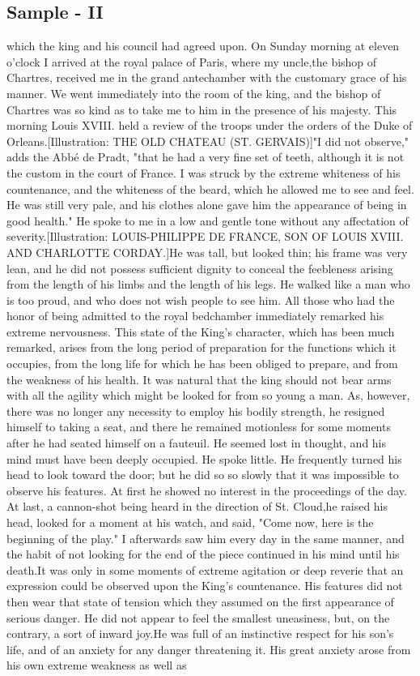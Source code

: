 \documentclass[a4paper]{article}
\begin{document}
\subsection{Sample - II}
which the king and his council had agreed upon. On Sunday morning at eleven o'clock I arrived at the royal palace of Paris, where my uncle,the bishop of Chartres, received me in the grand antechamber with the customary grace of his manner. We went immediately into the room of the king, and the bishop of Chartres was so kind as to take me to him in the presence of his majesty. This morning Louis XVIII. held a review of the troops under the orders of the Duke of Orleans.[Illustration: THE OLD CHATEAU (ST. GERVAIS)]"I did not observe," adds the Abbé de Pradt, "that he had a very fine set of teeth, although it is not the custom in the court of France. I was struck by the extreme whiteness of his countenance, and the whiteness of the beard, which he allowed me to see and feel. He was still very pale, and his clothes alone gave him the appearance of being in good health." He spoke to me in a low and gentle tone without any affectation of severity.[Illustration: LOUIS-PHILIPPE DE FRANCE, SON OF LOUIS XVIII. AND CHARLOTTE CORDAY.]He was tall, but looked thin; his frame was very lean, and he did not possess sufficient dignity to conceal the feebleness arising from the length of his limbs and the length of his legs. He walked like a man who is too proud, and who does not wish people to see him. All those who had the honor of being admitted to the royal bedchamber immediately remarked his extreme nervousness. This state of the King's character, which has been much remarked, arises from the long period of preparation for the functions which it occupies, from the long life for which he has been obliged to prepare, and from the weakness of his health. It was natural that the king should not bear arms with all the agility which might be looked for from so young a man. As, however, there was no longer any necessity to employ his bodily strength, he resigned himself to taking a seat, and there he remained motionless for some moments after he had seated himself on a fauteuil. He seemed lost in thought, and his mind must have been deeply occupied. He spoke little. He frequently turned his head to look toward the door; but he did so so slowly that it was impossible to observe his features. At first he showed no interest in the proceedings of the day. At last, a cannon-shot being heard in the direction of St. Cloud,he raised his head, looked for a moment at his watch, and said, "Come now, here is the beginning of the play." I afterwards saw him every day in the same manner, and the habit of not looking for the end of the piece continued in his mind until his death.It was only in some moments of extreme agitation or deep reverie that an expression could be observed upon the King's countenance. His features did not then wear that state of tension which they assumed on the first appearance of serious danger. He did not appear to feel the smallest uneasiness, but, on the contrary, a sort of inward joy.He was full of an instinctive respect for his son's life, and of an anxiety for any danger threatening it. His great anxiety arose from his own extreme weakness as well as 
\end{document}
